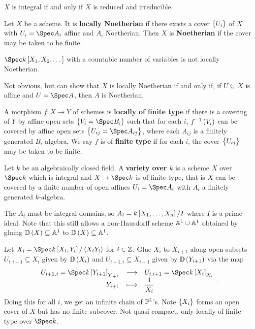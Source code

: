 \begin{theorem}
$ X $ is integral if and only if $ X $ is reduced and irreducible.
\end{theorem}

\begin{definition*}
Let $ X $ be a scheme. It is \textbf{locally Noetherian} if there exists a cover $ \cbr{U_i} $ of $ X $ with $ U_i = \Spec A_i $ affine and $ A_i $ Noetherian. Then $ X $ is \textbf{Noetherian} if the cover may be taken to be finite.
\end{definition*}

\begin{example*}
$ \Spec k\sbr{X_1, X_2, \dots} $ with a countable number of variables is not locally Noetherian.
\end{example*}

Not obvious, but can show that $ X $ is locally Noetherian if and only if, if $ U \subseteq X $ is affine and $ U = \Spec A $, then $ A $ is Noetherian.

\begin{definition*}
A morphism $ f : X \to Y $ of schemes is \textbf{locally of finite type} if there is a covering of $ Y $ by affine open sets $ \cbr{V_i = \Spec B_i} $ such that for each $ i $, $ f^{-1}\br{V_i} $ can be covered by affine open sets $ \cbr{U_{ij} = \Spec A_{ij}} $, where each $ A_{ij} $ is a finitely generated $ B_i $-algebra. We say $ f $ is of \textbf{finite type} if for each $ i $, the cover $ \cbr{U_{ij}} $ may be taken to be finite.
\end{definition*}

\begin{definition*}
Let $ k $ be an algebraically closed field. A \textbf{variety over $ k $} is a scheme $ X $ over $ \Spec k $ which is integral and $ X \to \Spec k $ is of finite type, that is $ X $ can be covered by a finite number of open affines $ U_i = \Spec A_i $ with $ A_i $ a finitely generated $ k $-algebra.
\end{definition*}

The $ A_i $ must be integral domains, so $ A_i = k\sbr{X_1, \dots, X_n} / I $ where $ I $ is a prime ideal. Note that this still allows a non-Hausdorff scheme $ \AA^1 \cup \AA^1 $ obtained by gluing $ \DD\br{X} \subseteq \AA^1 $ to $ \DD\br{X} \subseteq \AA^1 $.

\begin{example*}
Let $ X_i = \Spec k\sbr{X_i, Y_i} / \abr{X_iY_i} $ for $ i \in \ZZ $. Glue $ X_i $ to $ X_{i + 1} $ along open subsets $ U_{i, i + 1} \subseteq X_i $ given by $ \DD\br{X_i} $ and $ U_{i + 1, i} \subseteq X_{i + 1} $ given by $ \DD\br{Y_{i + 1}} $ via the map
$$ \function{U_{i + 1, i} = \Spec k\sbr{Y_{i + 1}}_{Y_{i + 1}}}{U_{i, i + 1} = \Spec k\sbr{X_i}_{X_i}}{Y_{i + 1}}{\dfrac{1}{X_i}}. $$
Doing this for all $ i $, we get an infinite chain of $ \PP^1 $'s. Note $ \cbr{X_i} $ forms an open cover of $ X $ but has no finite subcover. Not quasi-compact, only locally of finite type over $ \Spec k $.
\end{example*}

